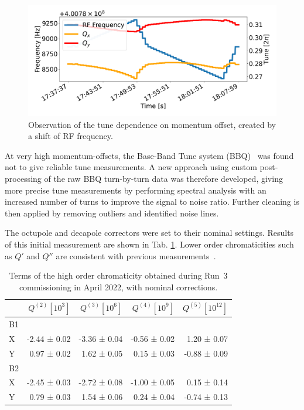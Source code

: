 \begin{figure}[tbh]
    \centering
    \includegraphics[width=\columnwidth]{images/MOPL027_f1-1.pdf}
    \caption{Observation of the tune dependence on momentum offset, created by a shift of RF frequency.}
    \label{rf_scan}
\end{figure}

At very high momentum-offsets, the Base-Band Tune system (BBQ)~\cite{gasior_principle_2005, boccardi_first_2009}
was found not to give reliable tune measurements. A new approach using custom post-processing of the raw BBQ 
turn-by-turn data was therefore developed, giving more precise tune measurements by performing
spectral analysis with an increased number of turns to improve the signal to noise ratio. Further cleaning is
then applied by removing outliers and identified noise lines.

The octupole and decapole correctors were set to their nominal settings.
Results of this initial measurement are shown in Tab. \ref{chroma_fidel}. Lower order chromaticities such as
$Q'$ and $Q''$ are consistent with previous measurements~\cite{maclean_commissioning_2016}.

\begin{table}[tbh]
    \centering
    \small
    \setlength{\tabcolsep}{4.2pt}
    \begin{tabular}{|l||r|r|r|r|}
    \hline
                  & $Q^{(2)} [10^3]$ & $Q^{(3)} [10^6]$ & $Q^{(4)} [10^9]$ & $Q^{(5)} [10^{12}]$ \\ \hline\hline
        B1        &              &               &              & \\
        X         & -2.44 ± 0.02 & -3.36 ± 0.04 & -0.56 ± 0.02  &  1.20 ± 0.07 \\
        Y         &  0.97 ± 0.02 &  1.62 ± 0.05  &  0.15 ± 0.03 & -0.88 ± 0.09 \\ \hline
        B2        &              &               &              & \\
        X         & -2.45 ± 0.03 & -2.72 ± 0.08 & -1.00 ± 0.05  &  0.15 ± 0.14 \\
        Y         &  0.79 ± 0.03 & 1.54 ± 0.06  &  0.24 ± 0.04  & -0.74 ± 0.13 \\ \hline
    \end{tabular}
    \caption{Terms of the high order chromaticity obtained during Run~3 commissioning in April 2022, with nominal corrections.}
    \label{chroma_fidel}
\end{table}

